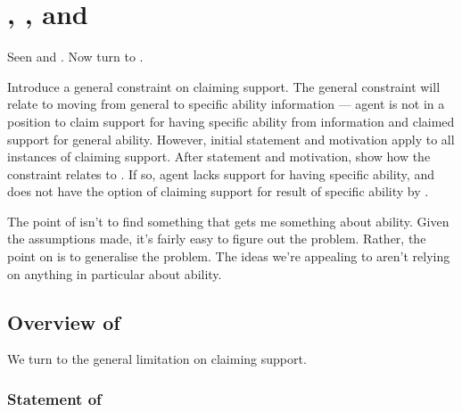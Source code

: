 \chapter{\nI{}, \gsi{}, and }
\label{sec:second-conditional}

\begin{note}
  Seen \ESU{} and \adB{}.
  Now turn to \adA{}.
\end{note}

\begin{note}
  Introduce a general constraint on claiming support.
  The general constraint will relate to moving from general to specific ability information --- agent is not in a position to claim support for having specific ability from information and claimed support for general ability.
  However, initial statement and motivation apply to all instances of claiming support.
  After statement and motivation, show how the constraint relates to \adA{}.
  If so, agent lacks support for having specific ability, and does not have the option of claiming support for result of specific ability by \adA{}.
\end{note}

\begin{note}
  \color{red}
  \large

  The point of \nI{} isn't to find something that gets me something about ability.
  Given the assumptions made, it's fairly easy to figure out the problem.
  Rather, the point on \nI{} is to generalise the problem.
  The ideas we're appealing to aren't relying on anything in particular about ability.
\end{note}

\section{Overview of \nI{}}
\label{sec:ni-1}

\begin{note}
  We turn to the general limitation on claiming support.
\end{note}

\subsection{Statement of \nI{}}

